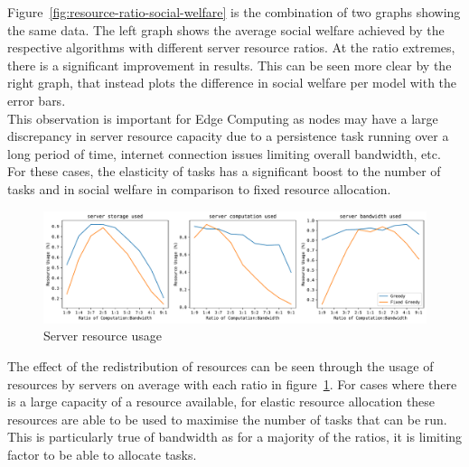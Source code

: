 Figure~\ref{fig:resource-ratio-social-welfare} is the combination of two graphs showing the same data. The left graph
shows the average social welfare achieved by the respective algorithms with different server resource ratios. At the
ratio extremes, there is a significant improvement in results. This can be seen more clear by the right graph, that
instead plots the difference in social welfare per model with the error bars. \\
This observation is important for Edge Computing as nodes may have a large discrepancy in server resource capacity
due to a persistence task running over a long period of time, internet connection issues limiting overall bandwidth,
etc. For these cases, the elasticity of tasks has a significant boost to the number of tasks and in social
welfare in comparison to fixed resource allocation.

\begin{figure}[h]
    \centering
    \includegraphics[width=\linewidth]{figs/resource_ratio/server_resource_usage.pdf}
    \caption{Server resource usage}
    \label{fig:resource-ratio-server-resource-usage}
\end{figure}

The effect of the redistribution of resources can be seen through the usage of resources by servers on average with
each ratio in figure~\ref{fig:resource-ratio-server-resource-usage}. For cases where there is a large capacity of a
resource available, for elastic resource allocation these resources are able to be used to maximise the number of tasks
that can be run. This is particularly true of bandwidth as for a majority of the ratios, it is limiting factor to be
able to allocate tasks.

